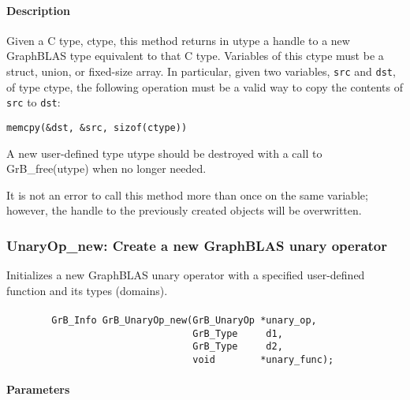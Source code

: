\paragraph{Description}

Given a C type, {\sf ctype}, this method returns in {\sf utype} a handle to
a new GraphBLAS type equivalent to that C type.  Variables of this {\sf ctype} 
must be a struct, union, or fixed-size array. In particular, given two variables, 
{\tt src} and {\tt dst}, of type {\sf ctype}, the following operation must be a 
valid way to copy the contents of {\tt src} to {\tt dst}:

\begin{center}
{\tt memcpy(\&dst, \&src, sizof({\sf ctype}))}
\end{center}

A new user-defined type {\sf utype} should be destroyed with a call to 
{\sf GrB\_free(utype)} when no longer needed.

It is not an error to call this method more than once on the same variable;  
however, the handle to the previously created objects will be overwritten. 

\subsubsection{{\sf UnaryOp\_new}: Create a new GraphBLAS unary operator}

Initializes a new GraphBLAS unary operator with a specified user-defined 
function and its types (domains).

\paragraph{\syntax}

\begin{verbatim}
        GrB_Info GrB_UnaryOp_new(GrB_UnaryOp *unary_op,
                                 GrB_Type     d1,
                                 GrB_Type     d2,
                                 void        *unary_func);
\end{verbatim}

\paragraph{Parameters}

